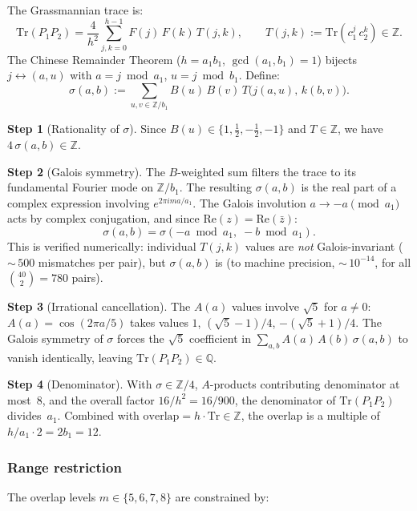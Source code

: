 \documentclass[12pt,a4paper]{article}
\theoremstyle{definition}
\begin{document}
The Grassmannian trace is:
\begin{equation}
\mathrm{Tr}(P_1 P_2) = \frac{4}{h^2} \sum_{j,k=0}^{h-1} F(j)\,F(k)\,T(j,k), \qquad T(j,k) := \mathrm{Tr}(c_1^j\, c_2^k) \in \mathbb{Z}.
\end{equation}
The Chinese Remainder Theorem ($h = a_1 b_1$, $\gcd(a_1, b_1) = 1$) bijects $j \leftrightarrow (a, u)$ with $a = j \bmod a_1$, $u = j \bmod b_1$.  Define:
\begin{equation}
\sigma(a,b) := \sum_{u,v \in \mathbb{Z}/b_1} B(u)\,B(v)\,T\bigl(j(a,u),\, k(b,v)\bigr).
\end{equation}

\textbf{Step 1} (Rationality of $\sigma$).  Since $B(u) \in \{1, \tfrac{1}{2}, -\tfrac{1}{2}, -1\}$ and $T \in \mathbb{Z}$, we have $4\,\sigma(a,b) \in \mathbb{Z}$.

\textbf{Step 2} (Galois symmetry).  The $B$-weighted sum filters the trace to its fundamental Fourier mode on $\mathbb{Z}/b_1$.  The resulting $\sigma(a,b)$ is the real part of a complex expression involving $e^{2\pi i m a/a_1}$.  The Galois involution $a \to -a \pmod{a_1}$ acts by complex conjugation, and since $\mathrm{Re}(z) = \mathrm{Re}(\bar{z})$:
\begin{equation}
\sigma(a, b) = \sigma(-a \bmod a_1,\; -b \bmod a_1).
\end{equation}
This is verified numerically: individual $T(j,k)$ values are \emph{not} Galois-invariant (${\sim}\,500$ mismatches per pair), but $\sigma(a,b)$ is (to machine precision, ${\sim}\,10^{-14}$, for all $\binom{40}{2} = 780$ pairs).

\textbf{Step 3} (Irrational cancellation).  The $A(a)$ values involve $\sqrt{5}$ for $a \neq 0$: $A(a) = \cos(2\pi a/5)$ takes values $1$, $(\sqrt{5}-1)/4$, $-(\sqrt{5}+1)/4$.  The Galois symmetry of $\sigma$ forces the $\sqrt{5}$ coefficient in $\sum_{a,b} A(a)\,A(b)\,\sigma(a,b)$ to vanish identically, leaving $\mathrm{Tr}(P_1 P_2) \in \mathbb{Q}$.

\textbf{Step 4} (Denominator).  With $\sigma \in \mathbb{Z}/4$, $A$-products contributing denominator at most~$8$, and the overall factor $16/h^2 = 16/900$, the denominator of $\mathrm{Tr}(P_1 P_2)$ divides~$a_1$.  Combined with $\mathrm{overlap} = h \cdot \mathrm{Tr} \in \mathbb{Z}$, the overlap is a multiple of $h/a_1 \cdot 2 = 2b_1 = 12$.

\subsubsection{Range restriction}
The overlap levels $m \in \{5, 6, 7, 8\}$ are constrained by:
\end{document}
